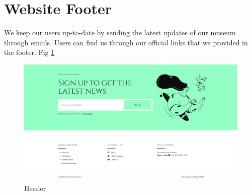 \documentclass{article}
\begin{document}
\section{Website Footer}
We keep our users up-to-date by sending the latest updates of our museum through emails.
Users can find us through our official links that we provided in the footer. Fig \ref{fig:footer}
\begin{figure}
	\centering
	\includegraphics[width=\linewidth]{img/footer.PNG}
	\caption{Header}
	\label{fig:footer}
\end{figure} 
\end{document}
